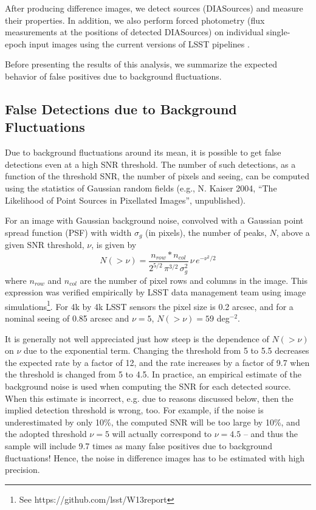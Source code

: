 After producing difference images, we detect sources (DIASources) and measure
their properties. In addition, we also perform forced photometry (flux measurements 
at the positions of detected DIASources) on individual single-epoch input images 
using the current versions of LSST pipelines \citep{juric15}. 

Before presenting the results of this analysis, we summarize the expected behavior
of false positives due to background fluctuations. 


\subsection{False Detections due to Background Fluctuations}

Due to background fluctuations around its mean, it is possible to get false
detections even at a high SNR threshold. The number of 
such detections, as a function of the threshold SNR, the number of pixels and 
seeing, can be computed using the statistics of Gaussian random fields (e.g., 
N. Kaiser 2004, ``The Likelihood of Point Sources in Pixellated Images'', unpublished). 

For an image with Gaussian background noise, convolved with a Gaussian point 
spread function (PSF) with width $\sigma_g$ (in pixels), the number of peaks, $N$, above a 
given SNR threshold, $\nu$, is given by 
\begin{equation}
N(>\nu)  = \frac{n_{row}*n_{col}}{2^{5/2} \, \pi^{3/2} \, \sigma_g^2} \, \nu \, e^{-\nu^2 /2} 
\label{eq-theory}
\end{equation}
where $n_{row}$ and $n_{col}$ are the number of pixel rows and columns in the image. 
This expression was verified empirically by LSST data management team using 
image simulations\footnote{See https://github.com/lsst/W13report}.
For 4k by 4k LSST sensors the pixel size is 0.2 arcsec, and for a nominal seeing
of 0.85 arcsec and $\nu=5$, $N(>\nu) = 59$ deg$^{-2}$. 

It is generally not well appreciated just how steep is the dependence of $N(>\nu)$
on $\nu$ due to the exponential term. Changing the threshold from 5 to 5.5
decreases the expected rate by a factor of 12, and the rate increases by a factor
of 9.7 when the threshold is changed from 5 to 4.5. In practice, an empirical estimate 
of the background noise is used when computing the SNR for each detected source.
When this estimate is incorrect, e.g. due to reasons discussed below, then the 
implied detection threshold is wrong, too. For example, if the noise is underestimated
by only 10\%, the computed SNR will be too large by 10\%, and the adopted 
threshold $\nu=5$ will actually correspond to $\nu=4.5$ -- and thus the 
sample will include 9.7 times as many false positives due to background 
fluctuations! Hence, the noise in difference images has to be estimated with
high precision. 



